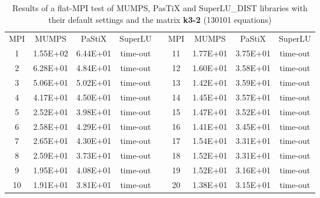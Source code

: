 \begin{table}[ht]
\centering
\begin{tabular}{|c|c|c|c|l|c|c|c|c|}
\cline{1-4} \cline{6-9}
MPI & MUMPS    & PaStiX   & SuperLU &  & MPI & MUMPS    & PaStiX   & SuperLU \\ \cline{1-4} \cline{6-9} 
1   & 1.55E+02 & 6.44E+01 & time-out &  & 11  & 1.77E+01 & 3.75E+01 & time-out \\ \cline{1-4} \cline{6-9} 
2   & 6.28E+01 & 4.84E+01 & time-out &  & 12  & 1.60E+01 & 3.58E+01 & time-out \\ \cline{1-4} \cline{6-9} 
3   & 5.06E+01 & 5.02E+01 & time-out &  & 13  & 1.42E+01 & 3.59E+01 & time-out \\ \cline{1-4} \cline{6-9} 
4   & 4.17E+01 & 4.50E+01 & time-out &  & 14  & 1.45E+01 & 3.57E+01 & time-out \\ \cline{1-4} \cline{6-9} 
5   & 2.52E+01 & 3.98E+01 & time-out &  & 15  & 1.47E+01 & 3.52E+01 & time-out \\ \cline{1-4} \cline{6-9} 
6   & 2.58E+01 & 4.29E+01 & time-out &  & 16  & 1.41E+01 & 3.45E+01 & time-out \\ \cline{1-4} \cline{6-9} 
7   & 2.65E+01 & 4.30E+01 & time-out &  & 17  & 1.54E+01 & 3.31E+01 & time-out \\ \cline{1-4} \cline{6-9} 
8   & 2.59E+01 & 3.73E+01 & time-out &  & 18  & 1.52E+01 & 3.31E+01 & time-out \\ \cline{1-4} \cline{6-9} 
9   & 1.95E+01 & 4.08E+01 & time-out &  & 19  & 1.52E+01 & 3.16E+01 & time-out \\ \cline{1-4} \cline{6-9} 
10  & 1.91E+01 & 3.81E+01 & time-out &  & 20  & 1.38E+01 & 3.15E+01 & time-out \\ \cline{1-4} \cline{6-9} 
\end{tabular}
\caption{Results of a flat-MPI test of MUMPS, PasTiX and SuperLU\_DIST libraries with their default settings and the matrix \textbf{k3-2} (130101 equations)}
\label{table:app-lc-k3-2-result}
\end{table}


